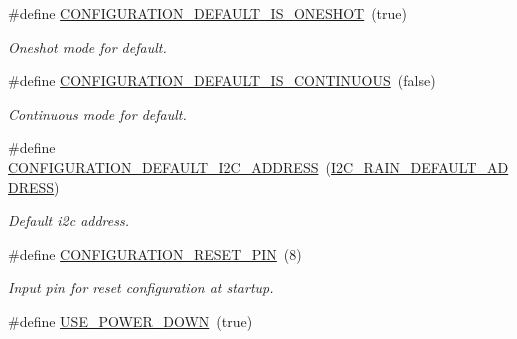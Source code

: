 \begin{DoxyCompactItemize}
\mbox{\label{i2c-rain-config_8h_a5c4024778a87026713c77babd50c06e8}} 
\#define \hyperlink{i2c-rain-config_8h_a5c4024778a87026713c77babd50c06e8}{C\+O\+N\+F\+I\+G\+U\+R\+A\+T\+I\+O\+N\+\_\+\+D\+E\+F\+A\+U\+L\+T\+\_\+\+I\+S\+\_\+\+O\+N\+E\+S\+H\+OT}~(true)
\begin{DoxyCompactList}\small\item\em Oneshot mode for default. \end{DoxyCompactList}\item 
\mbox{\label{i2c-rain-config_8h_a21819dc42c8c71731e30c99bcf8b0f76}} 
\#define \hyperlink{i2c-rain-config_8h_a21819dc42c8c71731e30c99bcf8b0f76}{C\+O\+N\+F\+I\+G\+U\+R\+A\+T\+I\+O\+N\+\_\+\+D\+E\+F\+A\+U\+L\+T\+\_\+\+I\+S\+\_\+\+C\+O\+N\+T\+I\+N\+U\+O\+US}~(false)
\begin{DoxyCompactList}\small\item\em Continuous mode for default. \end{DoxyCompactList}\item 
\mbox{\label{i2c-rain-config_8h_a25fb304ef264a84353f1d4cfc61128e9}} 
\#define \hyperlink{i2c-rain-config_8h_a25fb304ef264a84353f1d4cfc61128e9}{C\+O\+N\+F\+I\+G\+U\+R\+A\+T\+I\+O\+N\+\_\+\+D\+E\+F\+A\+U\+L\+T\+\_\+\+I2\+C\+\_\+\+A\+D\+D\+R\+E\+SS}~(\hyperlink{registers-rain_8h_a2aebb0ca4cdf424c57dee6f591c40e0c}{I2\+C\+\_\+\+R\+A\+I\+N\+\_\+\+D\+E\+F\+A\+U\+L\+T\+\_\+\+A\+D\+D\+R\+E\+SS})
\begin{DoxyCompactList}\small\item\em Default i2c address. \end{DoxyCompactList}\item 
\mbox{\label{i2c-rain-config_8h_ae90da4786d4ba14563681879dba4d39c}} 
\#define \hyperlink{i2c-rain-config_8h_ae90da4786d4ba14563681879dba4d39c}{C\+O\+N\+F\+I\+G\+U\+R\+A\+T\+I\+O\+N\+\_\+\+R\+E\+S\+E\+T\+\_\+\+P\+IN}~(8)
\begin{DoxyCompactList}\small\item\em Input pin for reset configuration at startup. \end{DoxyCompactList}\item 
\mbox{\label{i2c-rain-config_8h_a9ace81994cbeb6153f9dd5adf0e6dbee}} 
\#define \hyperlink{i2c-rain-config_8h_a9ace81994cbeb6153f9dd5adf0e6dbee}{U\+S\+E\+\_\+\+P\+O\+W\+E\+R\+\_\+\+D\+O\+WN}~(true)

\end{DoxyCompactItemize}
